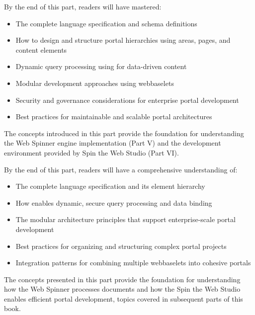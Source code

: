 By the end of this part, readers will have mastered:

\begin{itemize}
    \item The complete \wbdl{} language specification and schema definitions
    \item How to design and structure portal hierarchies using areas, pages, and content elements
    \item Dynamic query processing using \wbpl{} for data-driven content
    \item Modular development approaches using webbaselets
    \item Security and governance considerations for enterprise portal development
    \item Best practices for maintainable and scalable portal architectures
\end{itemize}

The concepts introduced in this part provide the foundation for understanding the Web Spinner engine implementation (Part V) and the development environment provided by Spin the Web Studio (Part VI).

By the end of this part, readers will have a comprehensive understanding of:

\begin{itemize}
\item The complete \wbdl{} language specification and its element hierarchy
\item How \wbpl{} enables dynamic, secure query processing and data binding
\item The modular architecture principles that support enterprise-scale portal development
\item Best practices for organizing and structuring complex portal projects
\item Integration patterns for combining multiple webbaselets into cohesive portals
\end{itemize}

The concepts presented in this part provide the foundation for understanding how the Web Spinner processes \wbdl{} documents and how the Spin the Web Studio enables efficient portal development, topics covered in subsequent parts of this book.
